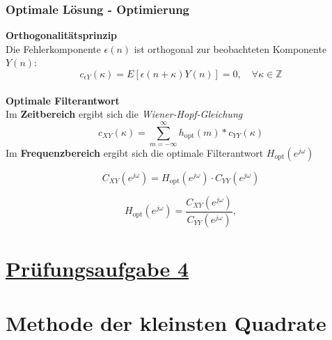\documentclass[12pt]{article}
\begin{document}
         \subsubsection{Optimale Lösung \textbf{-} Optimierung}

            \textbf{Orthogonalitätsprinzip} \\
            Die Fehlerkomponente \(\epsilon(n)\) ist orthogonal zur beobachteten Komponente \(Y(n)\):
            \[
               c_{\epsilon Y}(\kappa) = E\left[ \epsilon(n + \kappa) Y(n) \right] = 0, \quad \forall \kappa \in \mathbb{Z}
            \]
            \\
            \textbf{Optimale Filterantwort} \\
            Im \textbf{Zeitbereich} ergibt sich die \textit{Wiener-Hopf-Gleichung}
            \[
               c_{XY}(\kappa) = \sum_{m =- \infty}^{\infty} h_{\text{opt}}(m) \ast c_{YY}(\kappa) 
            \]
            Im \textbf{Frequenzbereich} ergibt sich die optimale Filterantwort \( H_{\text{opt}}(e^{j\omega}) \)

            \[
               C_{XY}(e^{j\omega}) = H_{\text{opt}}(e^{j\omega}) \cdot C_{YY}(e^{j\omega}) 
            \]

            \[
               H_{\text{opt}}(e^{j\omega}) = \frac{C_{XY}(e^{j\omega})}{C_{YY}(e^{j\omega})},
            \]

\newpage

\section*{\underline{Prüfungsaufgabe 4}}
\section*{Methode der kleinsten Quadrate}

\pagecolor{Aufgabe4}
\end{document}
